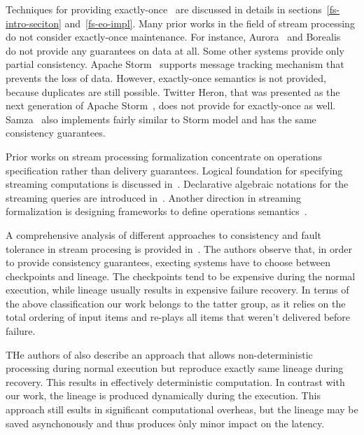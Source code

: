 
\label {fs-related-seciton}

Techniques for providing exactly-once~\cite{Carbone:2017:SMA:3137765.3137777, Akidau:2013:MFS:2536222.2536229, Zaharia:2012:DSE:2342763.2342773} are discussed   in details in sections~\ref{fs-intro-seciton} and~\ref{fs-eo-impl}. Many prior works in the field of stream processing do not consider exactly-once maintenance. 
For instance, Aurora~\cite{Abadi:2003:ANM:950481.950485} and Borealis~\cite{abadi2005design} do not provide any guarantees on data at all. Some other systems provide only partial consistency. Apache Storm~\cite{apache:storm} supports message tracking mechanism that prevents the loss of data. 
However, exactly-once semantics is not provided, because duplicates are still possible. Twitter Heron, that was presented as the next generation of Apache Storm~\cite{Kulkarni:2015:THS:2723372.2742788}, does not provide for exactly-once as well. 
Samza~\cite{Noghabi:2017:SSS:3137765.3137770} also implements fairly similar to Storm model and has the same consistency guarantees.

Prior works on stream processing formalization concentrate on operations specification rather than delivery guarantees. Logical foundation for specifying streaming computations is discussed in~\cite{alur2018interfaces}. Declarative algebraic notations for the streaming queries are introduced in~\cite{halle2014formalization}. Another direction in streaming formalization is designing frameworks to define operations semantics~\cite{beck2018lars}.

A comprehensive analysis of different approaches to consistency and fault tolerance in stream procesing is provided in~\cite{Wang:2019:LSF:3341301.3359653}.  The authors observe that, in order to provide consistency guarantees, execting systems have to choose between checkpoints and lineage. The checkpoints tend to be expensive during the normal execution, while lineage usually results in expensive failure recovery. In terms of the above classification our work belongs to the tatter group, as it relies on the total ordering of input items and  re-plays  all items that weren't delivered before failure. 

THe authors of \cite{Wang:2019:LSF:3341301.3359653} also describe an approach that allows non-deterministic processing during normal execution but reproduce exactly same lineage during recovery.  This results in effectively deterministic computation. In contrast with our work, the lineage is produced dynamically during the execution.  This approach still esults in significant computational overheas, but  the lineage may be saved asynchonously and thus produces ònly minor impact on the latency. 
